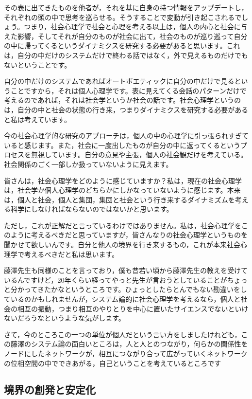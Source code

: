 \documentclass{ltjsbook}
\begin{document}
その表に出てきたものを他者が，それを基に自身の持つ情報をアップデートし，それぞれの頭の中で思考を巡らせる。そうすることで変動が引き起こされるでしょう。つまり，社会心理学で社会と心理を考える以上は，個人の内心と社会に与えた影響，そしてそれが自分のものが社会に出て，社会のものが巡り巡って自分の中に帰ってくるというダイナミクスを研究する必要があると思います。これは，自分の中だけのシステムだけで終わる話ではなく，外で見えるものだけでもないということです。

自分の中だけのシステムであればオートポエティックに自分の中だけで見るということですから，それは個人心理学です。表に見えてくる会話のパターンだけで考えるのであれば，それは社会学というか社会の話です。社会心理学というのは，自分の中と社会の状態の行き来，つまりダイナミクスを研究する必要があると私は考えています。

今の社会心理学的な研究のアプローチは，個人の中の心理学に引っ張られすぎていると感じます。また，社会に一度出したものが自分の中に返ってくるというプロセスを無視しています。自分の意見や主張，個人の社会観だけを考えている。社会関係のごく一部しか扱っていないように見えます。

皆さんは，社会心理学をどのように感じていますか？私は，現在の社会心理学は，社会学か個人心理学のどちらかにしかなっていないように感じます。本来は，個人と社会，個人と集団，集団と社会という行き来するダイナミズムを考える科学にしなければならないのではないかと思います。

ただし，これが正解だと言っているわけではありません。私は，社会心理学をこのように考えるべきだと思っていますが，皆さんなりの社会心理学というものを聞かせて欲しいんです。自分と他人の境界を行き来するもの，これが本来社会心理学で考えるべきだと私は思います。

藤澤先生も同様のことを言っており，僕も昔若い頃から藤澤先生の教えを受けているんですけど，20年くらい経ってやっと先生が言おうとしていることがちょっと分かってきたかなというところです。ひょっとしたらとんでもない勘違いをしているのかもしれませんが，システム論的に社会心理学を考えるなら，個人と社会の相互の振動，つまり相互のやりとりを中心に置いたサイエンスでないといけないだろうなというような気がします。

さて，今のところこの一つの単位が個人だという言い方をしましたけれども，この藤澤のシステム論の面白いところは，人と人とのつながり，何らかの関係性をノードにしたネットワークが，相互につながり合って広がっていくネットワークの位相空間の中でできあがる，自己ということを考えているところです

\subsection{境界の創発と安定化}
\end{document}
